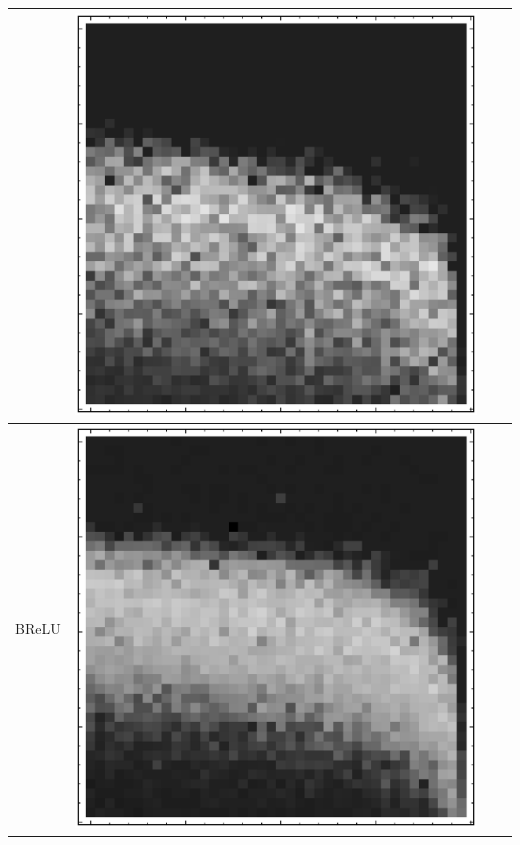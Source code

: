 \documentclass[10pt]{article}
\begin{document}
\begin{tabular}{|c|c|c|c|}
        & \includegraphics[scale=0.25]{plots/simple/LF-20R10R-20T10-CIFAR-3.eps} \\ \hline
BReLU 
        & \includegraphics[scale=0.25]{plots/simple/LF-20BR10BR-20T10-CIFAR-1.eps}

\end{tabular}
\end{document}
